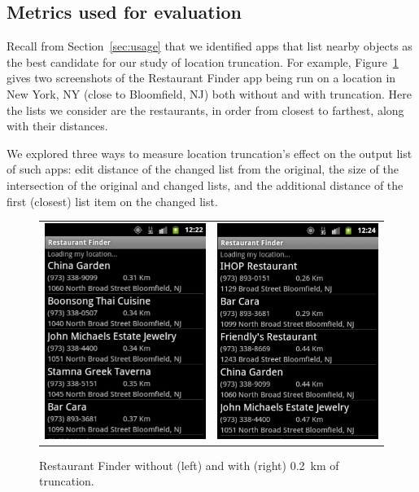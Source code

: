 \subsection{Metrics used for evaluation}
\label{sec:metrics}

Recall from Section~\ref{sec:usage} that we identified apps that list
nearby objects as the best candidate for our study of location
truncation. For example, Figure~\ref{fig:app-example} gives two
screenshots of the Restaurant Finder app being run on a location in
New York, NY (close to Bloomfield, NJ) both without and with
truncation. Here the lists we consider are the restaurants, in order
from closest to farthest, along with their distances.

We explored three ways to measure location truncation's effect on
the output list of such apps: edit distance of the changed list from the
original, the size of the intersection of the original and changed
lists, and the additional distance of the first (closest) list item on
the changed list.

\begin{figure}
  \centering
  \begin{tabular}{cc}
    \includegraphics[width=.4\columnwidth]{location_privacy/restaurant_finder_ref_screenshot}
    & 
    \includegraphics[width=.4\columnwidth]{location_privacy/restaurant_finder_nominal_screenshot}
  \end{tabular}
  \caption{Restaurant Finder without (left) and with (right)
    0.2~km of truncation.}
  \label{fig:app-example}
\end{figure}

